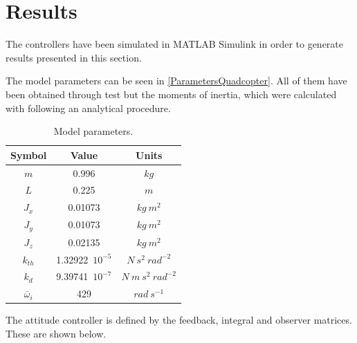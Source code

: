 \section{Results}
The controllers have been simulated in MATLAB Simulink in order to generate results presented in this section. 

The model parameters can be seen in \autoref{ParametersQuadcopter}. All of them have been obtained through test but the moments of inertia, which were calculated with following an analytical procedure.
\begin{table}[H]
    \centering
    \begin{tabular}{c|c|c}
        \textbf{Symbol} &\textbf{Value} &\textbf{Units}\\
        \hline %
         $m$ & 0.996       &$kg$\\
        \hline %
        $L$  &   0.225       & $m$\\
        \hline %
        $J_x$  & 0.01073       & $kg \  m^2$\\
        \hline %
        $J_y$  & 0.01073       & $kg \  m^2$\\
        \hline %
        $J_z$  & 0.02135       & $kg \  m^2$\\
        \hline %
        $k_{th}$  & 1.32922\ $10^{-5}$       & $N \  s^2 \  rad^{-2}$\\
        \hline %
        $k_{d}$  & 9.39741\ $10^{-7}$       & $N \  m \  s^2 \  rad^{-2}$\\
        \hline
         $\overline{\omega}_i$& 429      & $rad \ s^{-1}$\\
    \end{tabular}
    \caption{Model parameters.}
    \label{ParametersQuadcopter}
\end{table}
The attitude controller is defined by the feedback, integral and observer matrices. These are shown below.

